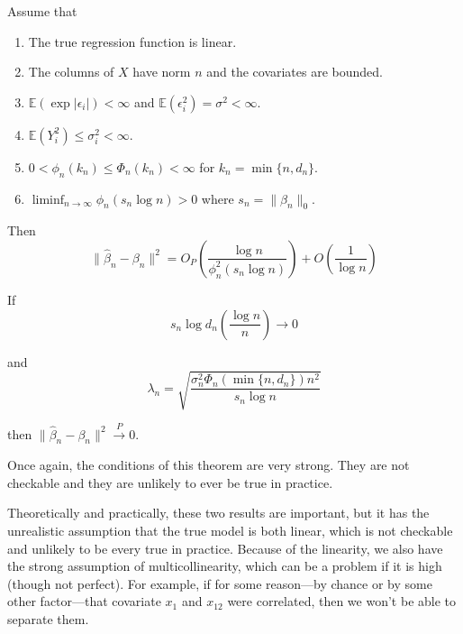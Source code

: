   \begin{theorem}
    Assume that
    \begin{enumerate}
      \item The true regression function is linear.
      
      \item The columns of $X$ have norm $n$ and the covariates are bounded.
      
      \item $\mathbb{E}(\exp |\epsilon_i|) < \infty$ and $\mathbb{E}(\epsilon_i^2) = \sigma^2 < \infty$.
      
      \item $\mathbb{E}(Y_i^2) \leq \sigma_i^2 < \infty$.
      
      \item $0 < \phi_n(k_n) \leq \Phi_n(k_n) < \infty$ for $k_n = \min\{n, d_n\}$.
      
      \item $\liminf_{n \to \infty} \phi_n(s_n \log n) > 0$ where $s_n = \|\beta_n\|_0$.
    \end{enumerate}

    Then
    \begin{equation}
      \|\hat{\beta}_n - \beta_n\|^2 = O_P \left( \frac{\log n}{\phi_n^2(s_n \log n)} \right) + O \left( \frac{1}{\log n} \right) 
    \end{equation}

    If
    \begin{equation}
      s_n \log d_n \left( \frac{\log n}{n} \right) \to 0 
    \end{equation}

    and
    \begin{equation}
      \lambda_n = \sqrt{\frac{\sigma_n^2 \Phi_n(\min\{n, d_n\})n^2}{s_n \log n}} 
    \end{equation}

    then $\|\hat{\beta}_n - \beta_n\|^2 \xrightarrow{P} 0$.

    Once again, the conditions of this theorem are very strong. They are not checkable and they are unlikely to ever be true in practice.
  \end{theorem}

  Theoretically and practically, these two results are important, but it has the unrealistic assumption that the true model is both linear, which is not checkable and unlikely to be every true in practice. Because of the linearity, we also have the strong assumption of multicollinearity, which can be a problem if it is high (though not perfect). For example, if for some reason---by chance or by some other factor---that covariate $x_1$ and $x_{12}$ were correlated, then we won't be able to separate them. 

